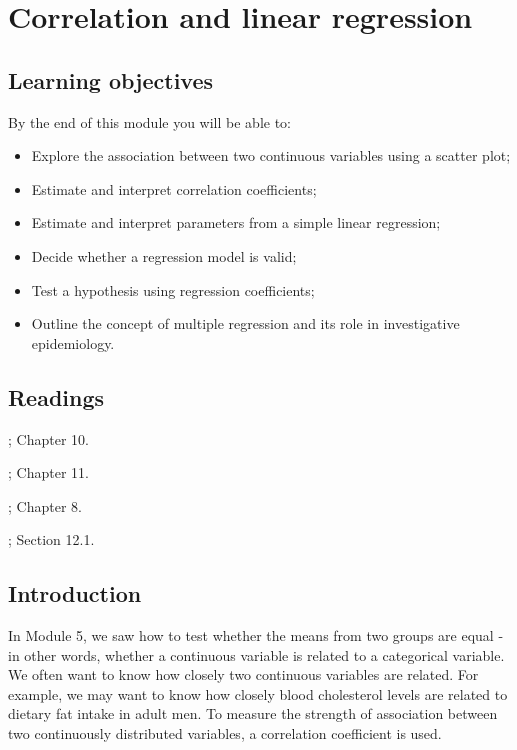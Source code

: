 \documentclass[
]{memoir}
\providecommand{\tightlist}{%
  \setlength{\itemsep}{0pt}\setlength{\parskip}{0pt}}
\begin{document}
\hypertarget{correlation-and-linear-regression}{%
\chapter{Correlation and linear regression}\label{correlation-and-linear-regression}}

\hypertarget{learning-objectives-7}{%
\section*{Learning objectives}\label{learning-objectives-7}}

By the end of this module you will be able to:

\begin{itemize}
\tightlist
\item
  Explore the association between two continuous variables using a scatter plot;
\item
  Estimate and interpret correlation coefficients;
\item
  Estimate and interpret parameters from a simple linear regression;
\item
  Decide whether a regression model is valid;
\item
  Test a hypothesis using regression coefficients;
\item
  Outline the concept of multiple regression and its role in investigative epidemiology.
\end{itemize}

\hypertarget{readings-7}{%
\section*{Readings}\label{readings-7}}

\citet{kirkwood_sterne01}; Chapter 10.

\citet{bland15}; Chapter 11.

\citet{acock10}; Chapter 8.

\citet{juul_frydenberg14}; Section 12.1.

\hypertarget{introduction-7}{%
\section{Introduction}\label{introduction-7}}

In Module 5, we saw how to test whether the means from two groups are equal - in other words, whether a continuous variable is related to a categorical variable. We often want to know how closely two continuous variables are related. For example, we may want to know how closely blood cholesterol levels are related to dietary fat intake in adult men. To measure the strength of association between two continuously distributed variables, a correlation coefficient is used.
\end{document}
